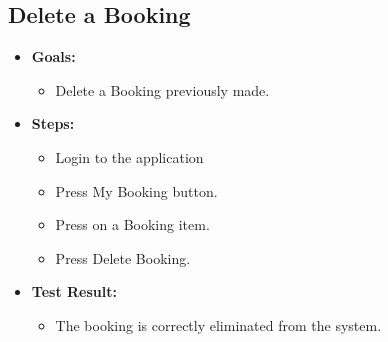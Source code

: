 \documentclass{Configuration_Files/PoliMi3i_thesis}
\begin{document}
\subsection{Delete a Booking}
\begin{itemize}
    \item\textbf{Goals:}
        \begin{itemize}
            \item Delete a Booking previously made. 
       \end{itemize}
    \item \textbf{Steps:}
        \begin{itemize}
            \item Login to the application  
            \item Press My Booking button. 
            \item Press on a Booking item.
            \item Press Delete Booking. 
        \end{itemize}
    \item\textbf{Test Result:}
        \begin{itemize}
            \item The booking is correctly eliminated from the system. 
    
    \end{itemize}
\end{itemize}
\end{document}
